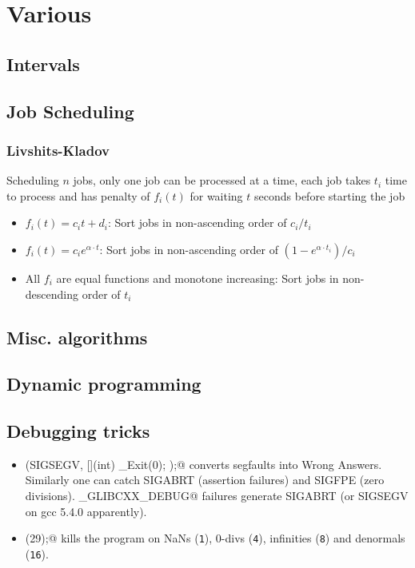 \chapter{Various}

\section{Intervals}

\section{Job Scheduling}
    \subsection{Livshits-Kladov}
        Scheduling $n$ jobs, only one job can be processed at a time, each job takes $t_i$ time to process and has penalty of $f_i(t)$ for waiting $t$ seconds before starting the job
        \begin{itemize}
            \item $f_i(t)=c_i t+d_i$: Sort jobs in non-ascending order of $c_i/t_i$
            \item $f_i(t)=c_i e^{\alpha\cdot t}$: Sort jobs in non-ascending order of $(1-e^{\alpha\cdot t_i})/c_i$
            \item All $f_i$ are equal functions and monotone increasing: Sort jobs in non-descending order of $t_i$
        \end{itemize}

\section{Misc. algorithms}

\section{Dynamic programming}

\section{Debugging tricks}
	\begin{itemize}
		\item \verb@signal(SIGSEGV, [](int) { _Exit(0); });@ converts segfaults into Wrong Answers.
			Similarly one can catch SIGABRT (assertion failures) and SIGFPE (zero divisions).
			\verb@_GLIBCXX_DEBUG@ failures generate SIGABRT (or SIGSEGV on gcc 5.4.0 apparently).
		\item \verb@feenableexcept(29);@ kills the program on NaNs (\texttt 1), 0-divs (\texttt 4), infinities (\texttt 8) and denormals (\texttt{16}).
	\end{itemize}


